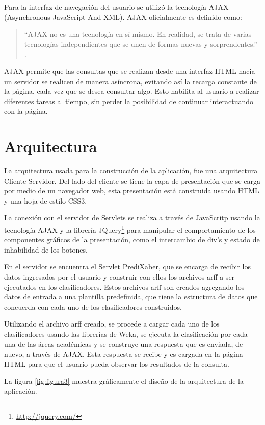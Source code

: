 Para la interfaz de navegación del usuario se utilizó la tecnología AJAX (Asynchronous JavaScript And XML). AJAX oficialmente es definido como: \begin{quote}“AJAX no es una tecnología en sí mismo. En realidad, se trata de varias tecnologías independientes que se unen de formas nuevas y sorprendentes.” \cite{key-270}.\end{quote}

AJAX permite que las consultas que se realizan desde una interfaz HTML hacia un servidor se realicen de manera asíncrona, evitando así la recarga constante de la página, cada vez que se desea consultar algo. Esto habilita al usuario a realizar diferentes tareas al tiempo, sin perder la posibilidad de continuar interactuando con la página.
\section{Arquitectura}
La arquitectura usada para la construcción de la aplicación, fue una arquitectura Cliente-Servidor. Del lado del cliente se tiene la capa de presentación que se carga por medio de un navegador web, esta presentación está construida usando HTML y una hoja de estilo CSS3.

La conexión con el servidor de Servlets se realiza a través de JavaScritp usando la tecnología AJAX y la librería JQuery\footnote{\url{http://jquery.com/}} para manipular el comportamiento de los componentes gráficos de la presentación, como el intercambio de div’s y estado de inhabilidad de los botones.

En el servidor se encuentra el Servlet PrediXaber, que se encarga de recibir los datos ingresados por el usuario y construir con ellos los archivos arff a ser ejecutados en los clasificadores. Estos archivos arff son creados agregando los datos de entrada a una plantilla predefinida, que tiene la estructura de datos que concuerda con cada uno de los clasificadores construidos.

Utilizando el archivo arff creado, se procede a cargar cada uno de los clasificadores usando las librerías de Weka, se ejecuta la clasificación por cada una de las áreas académicas y se construye una respuesta que es enviada, de nuevo, a través de AJAX. Esta respuesta se recibe y es cargada en la página HTML para que el usuario pueda observar los resultados de la consulta.

La figura \ref{fig:figura3} muestra gráficamente el diseño de la arquitectura de la aplicación.

